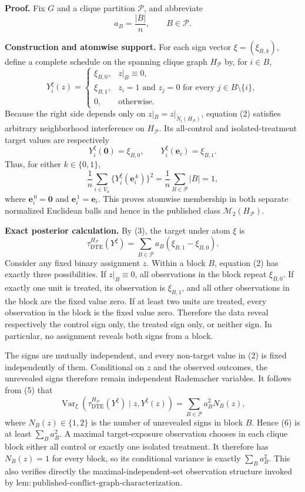 \textbf{Proof.}
Fix \(G\) and a clique partition \(\mathcal P\), and abbreviate
\[
a_B=\frac{|B|}{n},\qquad B\in\mathcal P.
\tag{1}
\]

\textbf{Construction and atomwise support.}
For each sign vector \(\xi=(\xi_{B,k})\), define a complete schedule on the spanning clique graph \(H_{\mathcal P}\) by, for \(i\in B\),
\[
Y_i^{\xi}(z)=
\begin{cases}
\xi_{B,0},&z|_B\equiv0,\\
\xi_{B,1},&z_i=1\text{ and }z_j=0\text{ for every }j\in B\setminus\{i\},\\
0,&\text{otherwise}.
\end{cases}
\tag{2}
\]
Because the right side depends only on \(z|_B=z|_{\widetilde N_i(H_{\mathcal P})}\), equation (2) satisfies arbitrary neighborhood interference on \(H_{\mathcal P}\). Its all-control and isolated-treatment target values are respectively
\[
Y_i^{\xi}(\mathbf0)=\xi_{B,0},
\qquad
Y_i^{\xi}(\mathbf e_i)=\xi_{B,1}.
\tag{3}
\]
Thus, for either \(k\in\{0,1\}\),
\[
\frac1n\sum_{i\in V_n}\{Y_i^{\xi}(\mathbf e_i^{\,k})\}^2
=\frac1n\sum_{B\in\mathcal P}|B|=1,
\tag{4}
\]
where \(\mathbf e_i^{\,0}=\mathbf0\) and \(\mathbf e_i^{\,1}=\mathbf e_i\). This proves atomwise membership in both separate normalized Euclidean balls and hence in the published class \(\mathcal M_2(H_{\mathcal P})\).

\textbf{Exact posterior calculation.}
By (3), the target under atom \(\xi\) is
\[
\tau_{\mathrm{DTE}}^{H_{\mathcal P}}(Y^{\xi})
=\sum_{B\in\mathcal P}a_B(\xi_{B,1}-\xi_{B,0}).
\tag{5}
\]
Consider any fixed binary assignment \(z\). Within a block \(B\), equation (2) has exactly three possibilities. If \(z|_B\equiv0\), all observations in the block repeat \(\xi_{B,0}\). If exactly one unit is treated, its observation is \(\xi_{B,1}\), and all other observations in the block are the fixed value zero. If at least two units are treated, every observation in the block is the fixed value zero. Therefore the data reveal respectively the control sign only, the treated sign only, or neither sign. In particular, no assignment reveals both signs from a block.

The signs are mutually independent, and every non-target value in (2) is fixed independently of them. Conditional on \(z\) and the observed outcomes, the unrevealed signs therefore remain independent Rademacher variables. It follows from (5) that
\[
\operatorname{Var}_{\xi}\!\left(
\tau_{\mathrm{DTE}}^{H_{\mathcal P}}(Y^{\xi})
\mid z,Y^{\xi}(z)
\right)
=\sum_{B\in\mathcal P}a_B^2N_B(z),
\tag{6}
\]
where \(N_B(z)\in\{1,2\}\) is the number of unrevealed signs in block \(B\). Hence (6) is at least \(\sum_Ba_B^2\). A maximal target-exposure observation chooses in each clique block either all control or exactly one isolated treatment. It therefore has \(N_B(z)=1\) for every block, so its conditional variance is exactly \(\sum_Ba_B^2\). This also verifies directly the maximal-independent-set observation structure invoked by \(\mathrm{lem{:}published\text{-}conflict\text{-}graph\text{-}characterization}\).

